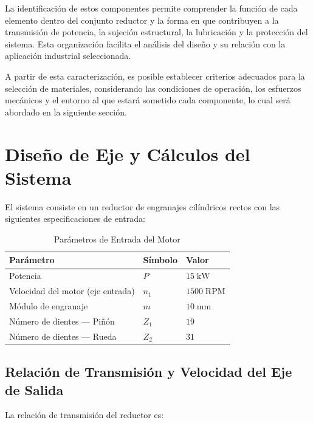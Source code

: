 \documentclass[conference]{IEEEtran}
\begin{document}
La identificación de estos componentes permite comprender la función de cada elemento
dentro del conjunto reductor y la forma en que contribuyen a la transmisión de potencia,
la sujeción estructural, la lubricación y la protección del sistema. Esta organización facilita
el análisis del diseño y su relación con la aplicación industrial seleccionada.

A partir de esta caracterización, es posible establecer criterios adecuados para la selección
de materiales, considerando las condiciones de operación, los esfuerzos mecánicos y el
entorno al que estará sometido cada componente, lo cual será abordado en la siguiente
sección.

\section{Diseño de Eje y Cálculos del Sistema}

El sistema consiste en un reductor de engranajes cilíndricos rectos con las siguientes
especificaciones de entrada:

\begin{table}[H]
\centering
\caption{Parámetros de Entrada del Motor}
\label{tab:parametros}
\begin{tabular}{lll}
\hline
\textbf{Parámetro} & \textbf{Símbolo} & \textbf{Valor} \\
\hline
Potencia                          & $P$   & $15\;\mathrm{kW}$   \\
Velocidad del motor (eje entrada) & $n_1$ & $1500\;\mathrm{RPM}$ \\
Módulo de engranaje               & $m$   & $10\;\mathrm{mm}$   \\
Número de dientes --- Piñón       & $Z_1$ & $19$                \\
Número de dientes --- Rueda       & $Z_2$ & $31$                \\
\hline
\end{tabular}
\end{table}

\subsection{Relación de Transmisión y Velocidad del Eje de Salida}

La relación de transmisión del reductor es:
\end{document}
